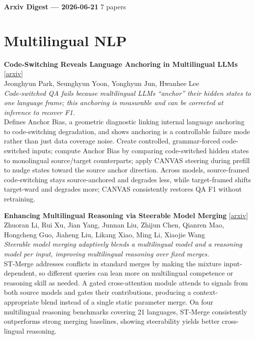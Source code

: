 \documentclass[12pt,letterpaper]{article}
\begin{document}
{\footnotesize\textbf{Arxiv Digest --- 2026-06-21} \hfill 7 papers}

\smallskip

\section*{Multilingual NLP}

{\small\textbf{Code-Switching Reveals Language Anchoring in Multilingual LLMs}} {\scriptsize[\href{https://arxiv.org/abs/2606.19668}{arxiv}]}\\
{\scriptsize Jeonghyun Park, Seunghyun Yoon, Yonghyun Jun, Hwanhee Lee}\\

{\small\textit{Code-switched QA fails because multilingual LLMs ``anchor'' their hidden states to one language frame; this anchoring is measurable and can be corrected at inference to recover F1.}}\\[1pt]
{\footnotesize Defines Anchor Bias, a geometric diagnostic linking internal language anchoring to code-switching degradation, and shows anchoring is a controllable failure mode rather than just data coverage noise. Create controlled, grammar-forced code-switched inputs; compute Anchor Bias by comparing code-switched hidden states to monolingual source/target counterparts; apply CANVAS steering during prefill to nudge states toward the source anchor direction. Across models, source-framed code-switching stays source-anchored and degrades less, while target-framed shifts target-ward and degrades more; CANVAS consistently restores QA F1 without retraining.}

\medskip

{\small\textbf{Enhancing Multilingual Reasoning via Steerable Model Merging}} {\scriptsize[\href{https://arxiv.org/abs/2606.19002}{arxiv}]}\\
{\scriptsize Zhuoran Li, Rui Xu, Jian Yang, Junnan Liu, Zhijun Chen, Qianren Mao, Hongcheng Guo, Jiaheng Liu, Likang Xiao, Ming Li, Xiaojie Wang}\\

{\small\textit{Steerable model merging adaptively blends a multilingual model and a reasoning model per input, improving multilingual reasoning over fixed merges.}}\\[1pt]
{\footnotesize ST-Merge addresses conflicts in standard merges by making the mixture input-dependent, so different queries can lean more on multilingual competence or reasoning skill as needed. A gated cross-attention module attends to signals from both source models and gates their contributions, producing a context-appropriate blend instead of a single static parameter merge. On four multilingual reasoning benchmarks covering 21 languages, ST-Merge consistently outperforms strong merging baselines, showing steerability yields better cross-lingual reasoning.}
\end{document}
